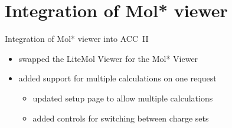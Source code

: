 \documentclass[
]{beamer}
\begin{document}
\begin{frame}{}
  \begin{figure}
    \centering
  \end{figure}  
\end{frame}

\section[Integration of Mol* viewer]{Integration of Mol* viewer}

\begin{frame}{Integration of Mol* viewer into ACC~II}
  \begin{itemize}
    \item swapped the LiteMol Viewer for the Mol* Viewer
    \item added support for multiple calculations on one request
    \begin{itemize}
      \item updated setup page to allow multiple calculations
      \item added controls for switching between charge sets
    \end{itemize}
  \end{itemize}
\end{frame}
\end{document}
